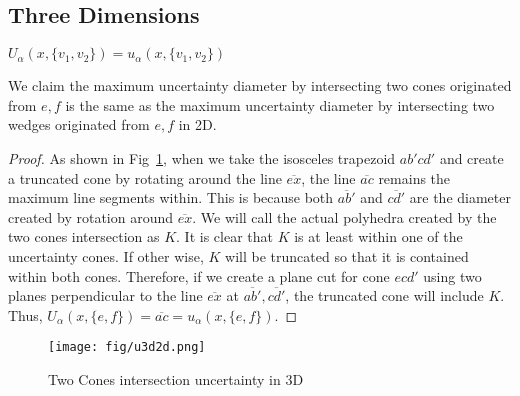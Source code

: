 %




\subsection{Three Dimensions}

\begin{lemma}
$U_\alpha(x,\{v_1,v_2\}) = u_\alpha(x,\{v_1,v_2\})$
\end{lemma}
 We claim the maximum uncertainty diameter by intersecting two cones originated from $e,f$ is the same as the maximum uncertainty diameter by intersecting two wedges originated from $e,f$ in 2D. 
\begin{proof}
As shown in Fig~\ref{fig:u3d2d}, when we take the isosceles trapezoid $ab'cd'$ and create a truncated cone by rotating around the line $\overline{ex}$, the line $\overline{ac}$ remains the maximum line segments within.  This is because both $\overline{ab'}$ and $\overline{cd'}$ are the diameter created by rotation around $\overline{ex}$. We will call the actual polyhedra created by the two cones intersection as $K$. It is clear that $K$ is at least within one of the uncertainty cones. If other wise, $K$ will be truncated so that it is contained within both cones. Therefore, if we create a plane cut for cone $ecd'$ using two planes perpendicular to the line $\overline{ex}$ at $\overline{ab'},\overline{cd'}$, the truncated cone will include $K$. Thus, $U_\alpha(x,\{e,f\})  = \overline{ac}= u_\alpha(x,\{e,f\})$.
\end{proof}

\begin{figure}[h]
\centering
	\texttt{[image: fig/u3d2d.png]}
	\caption{Two Cones intersection uncertainty in 3D}
	\label{fig:u3d2d}
\end{figure} 
